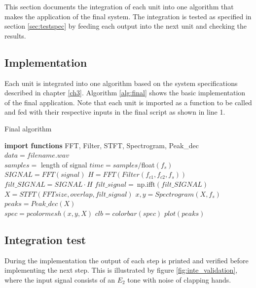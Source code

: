 This section documents the integration of each unit into one algorithm that makes the application of the final system. The integration is tested as specified in section \ref{sec:testspec} by feeding each output into the next unit and checking the results. 

\subsection{Implementation}
Each unit is integrated into one algorithm based on the system specifications described in chapter \ref{ch3}. Algorithm \ref{alg:final} shows the basic implementation of the final application. Note that each unit is imported as a function to be called and fed with their respective inputs in the final script as shown in line 1.
\begin{algorithm}[H]
\caption{Final algorithm}
\begin{algorithmic}[1]
\State \textbf{import functions} FFT, Filter, STFT, Spectrogram, Peak\_dec  
\\
\State $data = filename.wav$ 
\EndProcedure 
\\
\State $samples =$ length of signal
\State $time   = samples/$float$(f_s)$
\\
\State $SIGNAL = FFT(signal) $
\State $H = FFT(Filter(f_{c1},f_{c2},f_s))$
\State $filt\_SIGNAL = SIGNAL \cdot H$
\State $filt\_signal = \ $np.ifft$(filt\_SIGNAL)$
\EndProcedure 
\\
\State $X = STFT(FFTsize,overlap,filt\_signal)$
\State $x,y = Spectrogram(X,f_s)$
\State $peaks = Peak\_dec(X)$
\EndProcedure
\\
\State $spec=pcolormesh(x,y,X)$ 
\State $clb = colorbar(spec)$
\State $plot(peaks)$
\EndProcedure
\end{algorithmic}
\label{alg:final}
\end{algorithm}          

\subsection{Integration test}
During the implementation the output of each step is printed and verified before implementing the next step. This is illustrated by figure \ref{fig:inte_validation}, where the input signal consists of an $E_2$ tone with noise of clapping hands.

